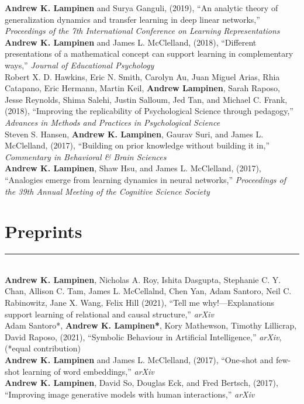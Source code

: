 \documentclass[margin]{res}
\begin{document}
\begin{resume}
\textbf{Andrew K. Lampinen} and Surya Ganguli, (2019), {``An analytic theory of generalization dynamics and transfer learning in deep linear networks,''} \textit{Proceedings of the 7th International Conference on Learning Representations} \\[3pt] 
\textbf{Andrew K. Lampinen} and James L. McClelland, (2018), {``Different presentations of a mathematical concept can support learning in complementary ways,''} \textit{Journal of Educational Psychology} \\[3pt]
 Robert X. D. Hawkins, Eric N. Smith, Carolyn Au, Juan Miguel Arias, Rhia Catapano, Eric Hermann, Martin Keil, \textbf{Andrew Lampinen}, Sarah Raposo, Jesse Reynolds, Shima Salehi, Justin Salloum, Jed Tan, and Michael C. Frank, (2018), {``Improving the replicability of Psychological Science through pedagogy,''}  \textit{Advances in Methods and Practices in Psychological Science} \\ [3pt]
Steven S. Hansen, \textbf{Andrew K. Lampinen}, Gaurav Suri, and James L. McClelland, (2017), {``Building on prior knowledge without building it in,''} \textit{Commentary in Behavioral \& Brain Sciences}  \\[3pt]
\textbf{Andrew K. Lampinen}, Shaw Hsu, and James L. McClelland, (2017), {``Analogies emerge from learning dynamics in neural networks,''} \textit{Proceedings of the 39th Annual Meeting of the Cognitive Science Society}  

\vspace{1pt}\section{Preprints} \vspace{-15pt} \rule{\textwidth}{0.5pt} \\[3pt]
\textbf{Andrew K. Lampinen}, Nicholas A. Roy, Ishita Dasgupta, Stephanie C. Y. Chan, Allison C. Tam, James L. McCellalnd, Chen Yan, Adam Santoro, Neil C. Rabinowitz, Jane X. Wang, Felix Hill (2021), {``Tell me why!---Explanations support learning of relational and causal structure,''} \textit{arXiv} \\[3pt] 
Adam Santoro*, \textbf{Andrew K. Lampinen*}, Kory Mathewson, Timothy Lillicrap, David Raposo, (2021), {``Symbolic Behaviour in Artificial Intelligence,''} \textit{arXiv}, (*equal contribution) \\[3pt] 
\textbf{Andrew K. Lampinen} and James L. McClelland, (2017), {``One-shot and few-shot learning of word embeddings,''} \textit{arXiv} \\[3pt] 
\textbf{Andrew K. Lampinen}, David So, Douglas Eck, and Fred Bertsch, (2017), {``Improving image generative models with human interactions,''} \textit{arXiv} 


\end{resume}
\end{document}
